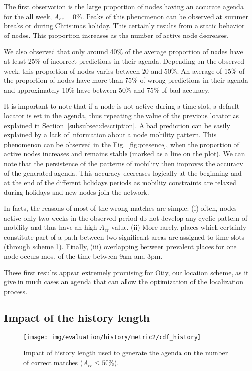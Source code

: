 \documentclass[a4paper]{sig-alternate-10pt}
\newcommand{\otiy}{{\sffamily Otiy}}
\begin{document}
The first observation is the large proportion of nodes having an
accurate agenda for the all week, $A_{er}=0\%$. Peaks of this
phenomenon can be observed at summer breaks or during Christmas
holiday. This certainly results from a static behavior of nodes.
This proportion increases as the number of active node decreases.

We also observed that only around 40\% of the average proportion 
of nodes have at least 25\% of incorrect predictions in their agenda.
Depending on the observed week, this  proportion of nodes varies
between 20 and 50\%. An average of 15\% of the proportion of nodes 
have more than 75\% of wrong predictions in their agenda and 
approximately 10\% have between 50\% and 75\% of bad accuracy.

It is important to note that if a node is not active during a time
slot, a default locator is set in the agenda, thus repeating the
value of the previous locator as explained in
Section~\ref{subsubsec:description}. A bad prediction can be easily
explained by a lack of information about a node mobility pattern.
This phenomenon can be observed in the Fig.~\ref{fig:presence}, when
the proportion of active nodes increases and remains stable
(marked as a line on the plot). We can note that the persistence of
the patterns of mobility then improves the accuracy of the
generated agenda. This accuracy decreases logically at the beginning
and at the end of the different holidays periods as mobility
constraints are relaxed during holidays and new nodes join the
network.

In facts, the reasons of most of the wrong matches are simple: (i)
often, nodes active only two weeks in the observed period do not
develop any cyclic pattern of mobility and thus have an high
$A_{er}$ value. (ii) More rarely, places which certainly constitute 
part of a path between two significant areas are assigned to time slots
(through scheme 1). Finally, (iii) overlapping between prevalent
places for one node occurs most of the time between 9am and 3pm.

These first results appear extremely promising for \otiy, our
location scheme, as it give in much cases an agenda that can allow
the optimization of  the localization process.

\subsection{Impact of the history length}
\begin{figure}
\texttt{[image: img/evaluation/history/metric2/cdf\_history]}
\caption{Impact of history length used to generate the agenda on the
number of correct matches ($A_{er}\leq 50\%$).}
\label{fig:history_length}
\end{figure}
\end{document}
